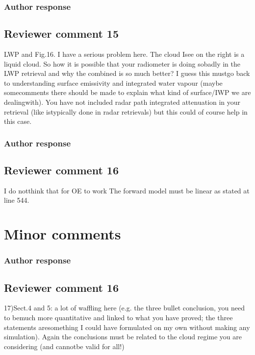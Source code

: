 \documentclass[11pt]{scrartcl}
\begin{document}
\subsubsection*{Author response}

\subsection*{Reviewer comment 15}
 LWP and Fig.16.  I have a serious problem here.  The cloud Isee on the right is a liquid cloud. So how it is possible that your radiometer is doing sobadly in the LWP retrieval and why the combined is so much better? I guess this mustgo back to understanding surface emissivity and integrated water vapour (maybe somecomments there should be made to explain what kind of surface/IWP we are dealingwith).  You have not included radar path integrated attenuation in your retrieval (like istypically done in radar retrievals) but this could of course help in this case.

\subsubsection*{Author response}

\subsection*{Reviewer comment 16}
I do notthink that for OE to work The forward model must be linear as stated at line 544.

\section{Minor comments}

\subsubsection*{Author response}

\subsection*{Reviewer comment 16}
17)Sect.4 and 5:  a lot of waffling here (e.g.  the three bullet conclusion, you need to bemuch more quantitative and linked to what you have proved; the three statements aresomething I could have formulated on my own without making any simulation).  Again the conclusions must be related to the cloud regime you are considering (and cannotbe valid for all!)
\end{document}
